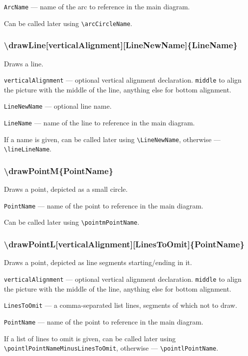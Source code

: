 \documentclass{ltxdoc}
\begin{document}
	\texttt{ArcName} — name of the arc to reference in the main diagram. 
	
	Can be called later using \texttt{\textbackslash arcCircleName}.
	
\subsubsection{\textbackslash drawLine[verticalAlignment][LineNewName]\{LineName\}}

	Draws a line.

	\texttt{verticalAlignment} — optional vertical alignment declaration. \texttt{middle} to align the picture with the middle of the line, anything else for bottom alignment.
	
	\texttt{LineNewName} — optional line name. 
	
	\texttt{LineName} — name of the line to reference in the main diagram. 
	
	If a name is given, can be called later using \texttt{\textbackslash LineNewName}, otherwise — \texttt{\textbackslash lineLineName}. 
	
\subsubsection{\textbackslash drawPointM\{PointName\}}

	Draws a point, depicted as a small circle.
	
	\texttt{PointName} — name of the point to reference in the main diagram. 
	
	Can be called later using \texttt{\textbackslash pointmPointName}. 

\subsubsection{\textbackslash drawPointL[verticalAlignment][LinesToOmit]\{PointName\}}

	Draws a point, depicted as line segments starting/ending in it.

	\texttt{verticalAlignment} — optional vertical alignment declaration. \texttt{middle} to align the picture with the middle of the line, anything else for bottom alignment.
	
	\texttt{LinesToOmit} — a comma-separated list lines, segments of which not to draw. 
	
	\texttt{PointName} — name of the point to reference in the main diagram. 
	
	If a list of lines to omit is given, can be called later using \texttt{\textbackslash pointlPointNameMinusLinesToOmit}, otherwise — \texttt{\textbackslash pointlPointName}. 

\end{document}
